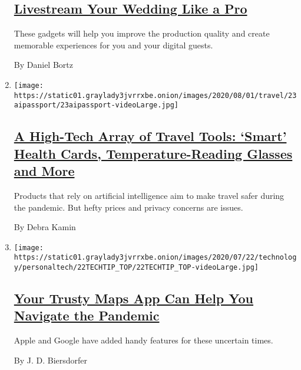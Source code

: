 \begin{enumerate}
  \hypertarget{livestream-your-wedding-like-a-pro}{%
  \subsection{\texorpdfstring{\href{/2020/07/28/fashion/weddings/livestream-your-wedding-like-a-pro.html}{Livestream
  Your Wedding Like a
  Pro}}{Livestream Your Wedding Like a Pro}}\label{livestream-your-wedding-like-a-pro}}

  These gadgets will help you improve the production quality and create
  memorable experiences for you and your digital guests.

  By Daniel Bortz
\item
  \texttt{[image: https://static01.graylady3jvrrxbe.onion/images/2020/08/01/travel/23aipassport/23aipassport-videoLarge.jpg]}

  \hypertarget{a-high-tech-array-of-travel-tools-smart-health-cards-temperature-reading-glasses-and-more}{%
  \subsection{\texorpdfstring{\href{/2020/07/23/travel/artificial-intelligence-coronavirus-passport.html}{A
  High-Tech Array of Travel Tools: `Smart' Health Cards,
  Temperature-Reading Glasses and
  More}}{A High-Tech Array of Travel Tools: `Smart' Health Cards, Temperature-Reading Glasses and More}}\label{a-high-tech-array-of-travel-tools-smart-health-cards-temperature-reading-glasses-and-more}}

  Products that rely on artificial intelligence aim to make travel safer
  during the pandemic. But hefty prices and privacy concerns are issues.

  By Debra Kamin
\item
  \texttt{[image: https://static01.graylady3jvrrxbe.onion/images/2020/07/22/technology/personaltech/22TECHTIP\_TOP/22TECHTIP\_TOP-videoLarge.jpg]}

  \hypertarget{your-trusty-maps-app-can-help-you-navigate-the-pandemic}{%
  \subsection{\texorpdfstring{\href{/2020/07/22/technology/personaltech/maps-apps-coronavirus-pandemic.html}{Your
  Trusty Maps App Can Help You Navigate the
  Pandemic}}{Your Trusty Maps App Can Help You Navigate the Pandemic}}\label{your-trusty-maps-app-can-help-you-navigate-the-pandemic}}

  Apple and Google have added handy features for these uncertain times.

  By J. D. Biersdorfer
\end{enumerate}

